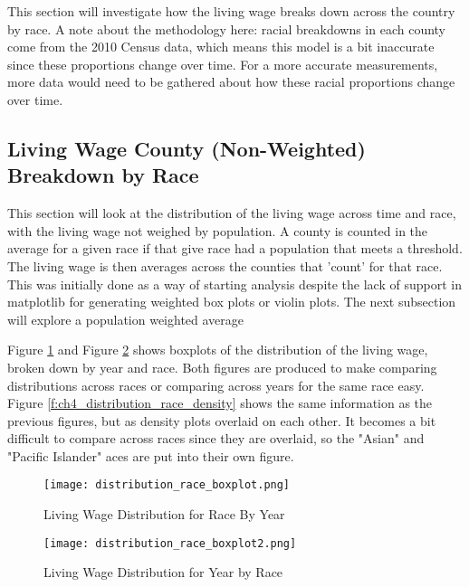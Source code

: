 This section will investigate how the living wage breaks down across the country by race. A note about the methodology here: racial breakdowns in each county come from the 2010 Census data, which means this model is a bit inaccurate since these proportions change over time. For a more accurate measurements, more data would need to be gathered about how these racial proportions change over time.

\subsection{Living Wage County (Non-Weighted) Breakdown by Race}

This section will look at the distribution of the living wage across time and race, with the living wage not weighed by population. A county is counted in the average for a given race if that give race had a population that meets a threshold. The living wage is then averages across the counties that 'count' for that race. This was initially done as a way of starting analysis despite the lack of support in matplotlib for generating weighted box plots or violin plots. The next subsection will explore a population weighted average

Figure \ref{f:ch4_distribution_race_boxplot} and Figure \ref{f:ch4_distribution_race_boxplot2} shows boxplots of the distribution of the living wage, broken down by year and race. Both figures are produced to make comparing distributions across races or comparing across years for the same race easy. Figure \ref{f:ch4_distribution_race_density} shows the same information as the previous  figures, but as density plots overlaid on each other. It becomes a bit difficult to compare across races since they are overlaid, so the "Asian" and "Pacific Islander" aces are put into their own figure.

\begin{figure}[H]
    \centering
        \texttt{[image: distribution\_race\_boxplot.png]}
        \caption{Living Wage Distribution for Race By Year}
    \label{f:ch4_distribution_race_boxplot}
\end{figure}

\begin{figure}[H]
    \centering
        \texttt{[image: distribution\_race\_boxplot2.png]}
        \caption{Living Wage Distribution for Year by Race}
    \label{f:ch4_distribution_race_boxplot2}
\end{figure}

